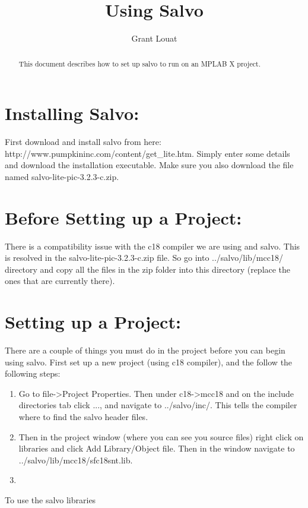 \documentclass[]{article}
\title{Using Salvo}
\author{Grant Louat}
\begin{document}
\maketitle

\begin{abstract}
This document describes how to set up salvo to run on an MPLAB X project.
\end{abstract}

\section{Installing Salvo:}
First download and install salvo from here: http://www.pumpkininc.com/content/get\_lite.htm. Simply enter some details and download the installation executable. \newline
Make sure you also download the file named salvo-lite-pic-3.2.3-c.zip.

\section{Before Setting up a Project:}
There is a compatibility issue with the c18 compiler we are using and salvo. This is resolved in the salvo-lite-pic-3.2.3-c.zip file. So go into ../salvo/lib/mcc18/ directory and copy all the files in the zip folder into this directory (replace the ones that are currently there).

\section{Setting up a Project:}
There are a couple of things you must do in the project before you can begin using salvo. First set up a new project (using c18 compiler), and the follow the following steps:
\begin{enumerate}
	\item Go to file->Project Properties. Then under c18->mcc18 and on the include directories tab click ..., and navigate to ../salvo/inc/. This tells the compiler where to find the salvo header files.
	\item Then in the project window (where you can see you source files) right click on libraries and click Add Library/Object file. Then in the window navigate to ../salvo/lib/mcc18/sfc18snt.lib.
	\item 
\end{enumerate}
To use the salvo libraries
\end{document}

